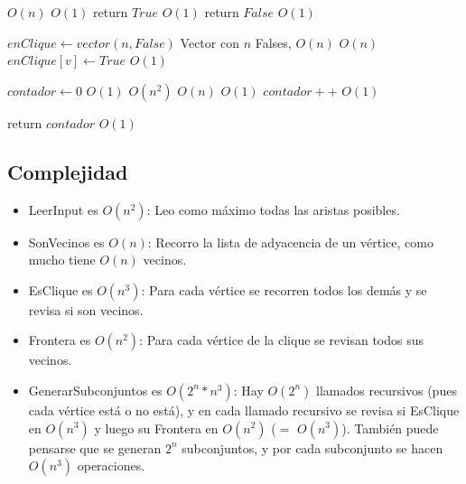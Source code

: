 \begin{algorithm}[H]
\begin{algorithmic}
        \Comment $O(n)$
                    \Comment $O(1)$
            \State return $True$ \Comment $O(1)$
        \EndIf
    \EndFor
    \State return $False$        \Comment $O(1)$

\EndFunction
\end{algorithmic}
\end{algorithm}

\begin{algorithm}[H]
\begin{algorithmic}
    \State $enClique \gets vector(n, False)$ \Comment Vector con $n$ Falses, $O(n)$
                        \Comment $O(n)$
        \State $enClique[v] \gets True$      \Comment $O(1)$
    \EndFor

    \State $contador \gets 0$                \Comment $O(1)$
                         \Comment $O(n^2)$
                \Comment $O(n)$
                 \Comment $O(1)$
                \State $contador++$          \Comment $O(1)$
            \EndIf
        \EndFor
    \EndFor

    \State return $contador$                 \Comment $O(1)$

\EndFunction
\end{algorithmic}
\end{algorithm}

\subsection{Complejidad}

\begin{itemize}
    \item LeerInput es $O(n^2)$: Leo como máximo todas las aristas posibles.
    \item SonVecinos es $O(n)$: Recorro la lista de adyacencia de un vértice, como mucho tiene $O(n)$ vecinos.
    \item EsClique es $O(n^{3})$: Para cada vértice se recorren todos los demás y se revisa si son vecinos.
    \item Frontera es $O(n^{2})$: Para cada vértice de la clique se revisan todos sus vecinos.
    \item GenerarSubconjuntos es $O(2^{n} * n^{3})$: Hay $O(2^n)$ llamados recursivos (pues cada vértice está o no está), y en cada llamado recursivo se revisa si EsClique en $O(n^3)$ y luego su Frontera en $O(n^2)$ ($=$ $O(n^3)$). También puede pensarse que se generan $2^n$ subconjuntos, y por cada subconjunto se hacen $O(n^3)$ operaciones.
\end{itemize}

